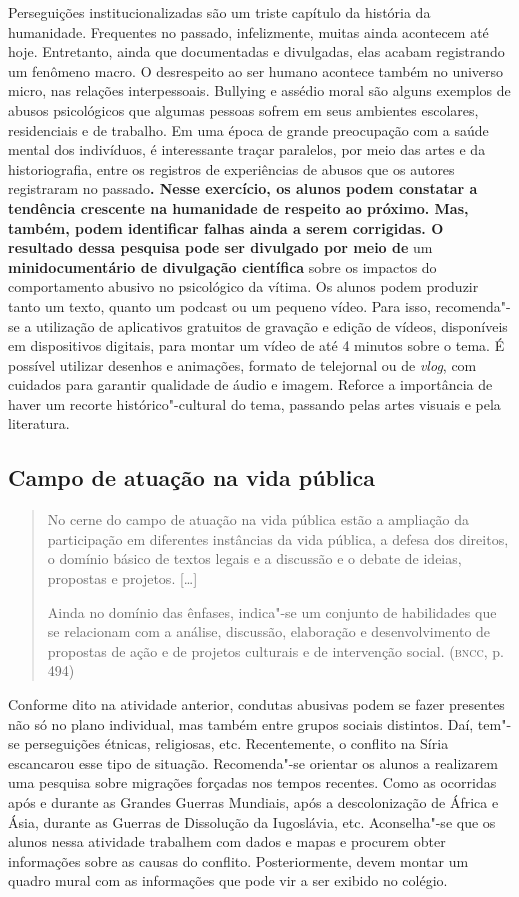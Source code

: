 \documentclass[12pt]{extarticle}
\begin{document}
Perseguições institucionalizadas são um triste capítulo da história da
humanidade. Frequentes no passado, infelizmente, muitas ainda
acontecem até hoje. Entretanto, ainda que documentadas e divulgadas,
elas acabam registrando um fenômeno macro. O desrespeito ao ser humano
acontece também no universo micro, nas relações interpessoais.
Bullying e assédio moral são alguns exemplos de abusos psicológicos
que algumas pessoas sofrem em seus ambientes escolares, residenciais e
de trabalho. Em uma época de grande preocupação com a saúde mental dos
indivíduos, é interessante traçar paralelos, por meio das artes e da
historiografia, entre os registros de experiências de abusos que os
autores registraram no passado\textbf{. Nesse exercício, os alunos
podem constatar a tendência crescente na humanidade de respeito ao
próximo. Mas, também, podem identificar falhas ainda a serem
corrigidas. O resultado dessa pesquisa pode ser divulgado por meio de}
um \textbf{minidocumentário de divulgação científica} sobre os
impactos do comportamento abusivo no psicológico da vítima. Os alunos
podem produzir tanto um texto, quanto um podcast ou um pequeno vídeo.
Para isso, recomenda"-se a utilização de aplicativos gratuitos de
gravação e edição de vídeos, disponíveis em dispositivos digitais,
para montar um vídeo de até 4 minutos sobre o tema. É possível
utilizar desenhos e animações, formato de telejornal ou de
\emph{vlog}, com cuidados para garantir qualidade de áudio e imagem.
Reforce a importância de haver um recorte histórico"-cultural do tema,
passando pelas artes visuais e pela literatura.

\subsection{Campo de atuação na vida pública}

\begin{quote}
No cerne do campo de atuação na vida pública estão a ampliação da
participação em diferentes instâncias da vida pública, a defesa dos
direitos, o domínio básico de textos legais e a discussão e o debate de
ideias, propostas e projetos. {[}\ldots{}{]}

Ainda no domínio das ênfases, indica"-se um conjunto de habilidades que
se relacionam com a análise, discussão, elaboração e desenvolvimento de
propostas de ação e de projetos culturais e de intervenção social.
(\textsc{bncc}, p. 494)
\end{quote}

Conforme dito na atividade anterior, condutas abusivas podem se fazer
presentes não só no plano individual, mas também entre grupos sociais
distintos. Daí, tem"-se perseguições étnicas, religiosas, etc.
Recentemente, o conflito na Síria escancarou esse tipo de situação.
Recomenda"-se orientar os alunos a realizarem uma pesquisa sobre
migrações forçadas nos tempos recentes. Como as ocorridas após e
durante as Grandes Guerras Mundiais, após a descolonização de África e
Ásia, durante as Guerras de Dissolução da Iugoslávia, etc.
Aconselha"-se que os alunos nessa atividade trabalhem com dados e mapas
e procurem obter informações sobre as causas do conflito.
Posteriormente, devem montar um quadro mural com as informações que
pode vir a ser exibido no colégio.
\end{document}
